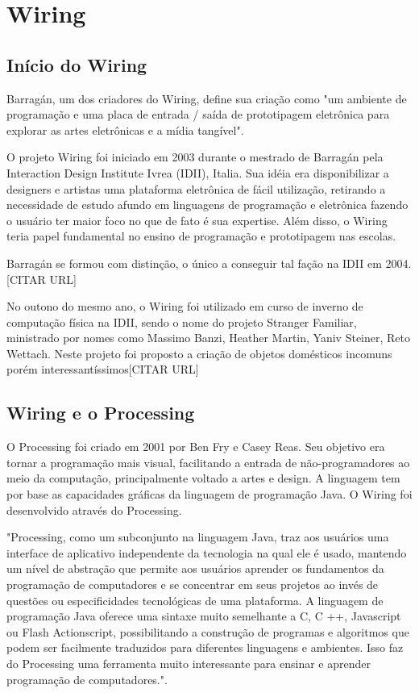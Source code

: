 \section[Wiring]{Wiring}

\subsection{Início do Wiring}
Barragán, um dos criadores do Wiring, define sua criação como "um ambiente de programação e uma placa de entrada / saída de prototipagem eletrônica para explorar as artes eletrônicas e a mídia tangível"\cite{Barragan2004}.

O projeto Wiring foi iniciado em 2003 durante o mestrado de Barragán pela Interaction Design Institute Ivrea (IDII), Italia. Sua idéia era disponibilizar a designers e artistas uma plataforma eletrônica de fácil utilização, retirando a necessidade de estudo afundo em linguagens de programação e eletrônica fazendo o usuário ter maior foco no que de fato é sua expertise. Além disso, o Wiring teria papel fundamental no ensino de programação e prototipagem nas escolas.

Barragán se formou com distinção, o único a conseguir tal fação na IDII em 2004.[CITAR URL]

No outono do mesmo ano, o Wiring foi utilizado em curso de inverno de computação física na IDII, sendo o nome do projeto Stranger Familiar, ministrado por nomes como Massimo Banzi, Heather Martin, Yaniv Steiner, Reto Wettach. Neste projeto foi proposto a criação de objetos domésticos incomuns porém interessantíssimos[CITAR URL]

\subsection{Wiring e o Processing}

O Processing foi criado em 2001 por Ben Fry e Casey Reas. Seu objetivo era tornar a programação mais visual, facilitando a entrada de não-programadores ao meio da computação, principalmente voltado a artes e design.\cite{Fry} A linguagem tem por base as capacidades gráficas da linguagem de programação Java. O Wiring foi desenvolvido através do Processing.

"Processing, como um subconjunto na linguagem Java, traz aos usuários uma interface de aplicativo independente da tecnologia na qual ele é usado, mantendo um nível de abstração que permite aos usuários aprender os fundamentos da programação de computadores e se concentrar em seus projetos ao invés de questões ou especificidades tecnológicas de uma plataforma. A linguagem de programação Java oferece uma sintaxe muito semelhante a C, C ++, Javascript ou Flash Actionscript, possibilitando a construção de programas e algoritmos que podem ser facilmente traduzidos para diferentes linguagens e ambientes. Isso faz do Processing uma ferramenta muito interessante para ensinar e aprender programação de computadores."\cite{Barragan2004}.

